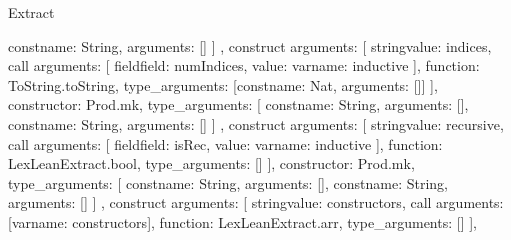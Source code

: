 \begin{lexlean}{Extract}
\begin{toolingmodule}
{{{{{{{{{{{{                                        const{name: String, arguments: []}
                                      ]
                                    },
                                    construct{
                                      arguments: [
                                        string{value: indices},
                                        call{
                                          arguments: [
                                            field{field: numIndices, value: var{name: inductive}}
                                          ],
                                          function: ToString.toString,
                                          type_arguments: [const{name: Nat, arguments: []}]
                                        }
                                      ],
                                      constructor: Prod.mk,
                                      type_arguments: [
                                        const{name: String, arguments: []},
                                        const{name: String, arguments: []}
                                      ]
                                    },
                                    construct{
                                      arguments: [
                                        string{value: recursive},
                                        call{
                                          arguments: [
                                            field{field: isRec, value: var{name: inductive}}
                                          ],
                                          function: LexLeanExtract.bool,
                                          type_arguments: []
                                        }
                                      ],
                                      constructor: Prod.mk,
                                      type_arguments: [
                                        const{name: String, arguments: []},
                                        const{name: String, arguments: []}
                                      ]
                                    },
                                    construct{
                                      arguments: [
                                        string{value: constructors},
                                        call{
                                          arguments: [var{name: constructors}],
                                          function: LexLeanExtract.arr,
                                          type_arguments: []
                                        }
                                      ],
}}}}}}}}}}}}
\end{toolingmodule}
\end{lexlean}
